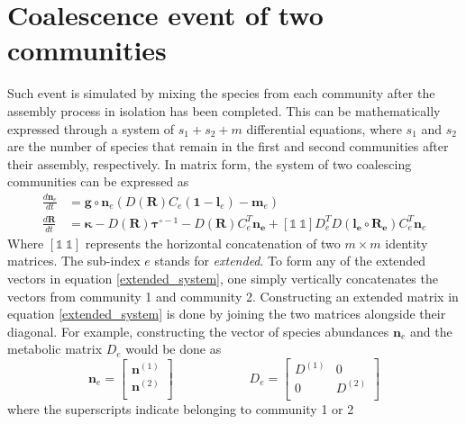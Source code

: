 \documentclass[12pt]{article}
\begin{document}
    \section{Coalescence event of two communities}
    Such event is simulated by mixing the species from each community after the assembly process in isolation has been completed. This can be mathematically expressed through a system of $ s_1 + s_2 + m $ differential equations, where $ s_1 $ and $ s_2 $ are the number of species that remain in the first and second communities after their assembly, respectively. 
    In matrix form, the system of two coalescing communities can be expressed as
    \begin{equation}\label{extended_system}
		\begin{aligned}
		\frac{d\boldsymbol{n}_e}{dt} &= \boldsymbol{g}\circ \boldsymbol{n}_{e}\left(D(\boldsymbol{R})C_{e}(\boldsymbol{1}-\boldsymbol{l}_e) - \boldsymbol{m}_e\right)\\
		\frac{d\boldsymbol{R}}{dt} &= \boldsymbol{\kappa} - D(\boldsymbol{R})\boldsymbol{\tau}^{\circ -1}- D(\boldsymbol{R})C_e^T\boldsymbol{n_e} + \left[\mathbb{1} \ \mathbb{1}\right] D_e^TD(\boldsymbol{l_e}\circ \boldsymbol{R_e})C_e^T\boldsymbol{n}_e
		\end{aligned}
	\end{equation}
	Where $ \left[\mathbb{1} \ \mathbb{1}\right] $ represents the horizontal concatenation of two $m \times m$ identity matrices. The sub-index $e$ stands for \textit{extended}. To form any of the extended vectors in equation \ref{extended_system}, one simply vertically concatenates the vectors from community 1 and community 2. Constructing an extended matrix in equation \ref{extended_system} is done by joining the two matrices alongside their diagonal. For example, constructing the vector of species abundances $\boldsymbol{n}_e$ and the metabolic matrix $D_e$ would be done as
	\begin{equation}
	    \boldsymbol{n}_e = \begin{bmatrix}
                                \boldsymbol{n}^{(1)} \\
                                \boldsymbol{n}^{(2)} \\
                            \end{bmatrix} 
        \qquad \qquad \qquad 
        D_e = \begin{bmatrix}
                    D^{(1)} & 0 \\
                    0 & D^{(2)} \\ 
              \end{bmatrix}
	\end{equation}
	where the superscripts indicate belonging to community 1 or 2
	\newpage
	
	
\end{document}
